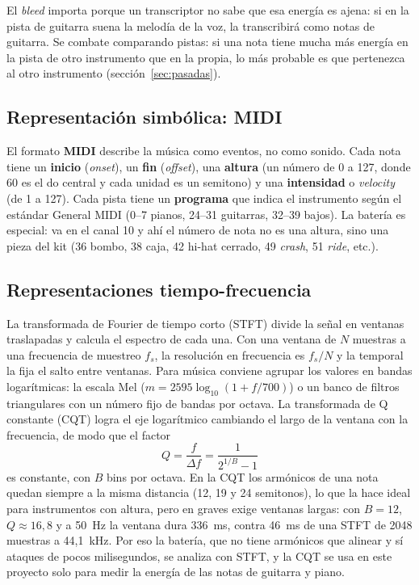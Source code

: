 \documentclass[11pt,a4paper]{article}
\begin{document}
El \emph{bleed} importa porque un transcriptor no sabe que esa energía es ajena: si en la pista de
guitarra suena la melodía de la voz, la transcribirá como notas de guitarra. Se combate comparando
pistas: si una nota tiene mucha más energía en la pista de otro instrumento que en la propia, lo más
probable es que pertenezca al otro instrumento (sección~\ref{sec:pasadas}).

\subsection{Representación simbólica: MIDI}
El formato \textbf{MIDI} describe la música como eventos, no como sonido. Cada nota tiene un
\textbf{inicio} (\emph{onset}), un \textbf{fin} (\emph{offset}), una \textbf{altura} (un número de 0 a 127,
donde 60 es el do central y cada unidad es un semitono) y una \textbf{intensidad} o \emph{velocity}
(de 1 a 127). Cada pista tiene un \textbf{programa} que indica el instrumento según el estándar General
MIDI (0--7 pianos, 24--31 guitarras, 32--39 bajos). La batería es especial: va en el canal 10 y ahí el
número de nota no es una altura, sino una pieza del kit (36 bombo, 38 caja, 42 hi-hat cerrado, 49
\emph{crash}, 51 \emph{ride}, etc.).

\subsection{Representaciones tiempo-frecuencia}
La transformada de Fourier de tiempo corto (STFT) divide la señal en ventanas traslapadas y calcula el
espectro de cada una. Con una ventana de $N$ muestras a una frecuencia de muestreo $f_s$, la resolución
en frecuencia es $f_s/N$ y la temporal la fija el salto entre ventanas. Para música conviene agrupar
los valores en bandas logarítmicas: la escala Mel ($m = 2595\log_{10}(1+f/700)$) o un banco de filtros
triangulares con un número fijo de bandas por octava. La transformada de Q constante (CQT) logra el
eje logarítmico cambiando el largo de la ventana con la frecuencia, de modo que el factor
\begin{equation}
Q = \frac{f}{\Delta f} = \frac{1}{2^{1/B}-1}
\end{equation}
es constante, con $B$ bins por octava. En la CQT los armónicos de una nota quedan siempre a la misma
distancia (12, 19 y 24 semitonos), lo que la hace ideal para instrumentos con altura, pero en graves
exige ventanas largas: con $B=12$, $Q\approx 16{,}8$ y a 50~Hz la ventana dura 336~ms, contra 46~ms de
una STFT de 2048 muestras a 44{,}1~kHz. Por eso la batería, que no tiene armónicos que alinear y sí
ataques de pocos milisegundos, se analiza con STFT, y la CQT se usa en este proyecto solo para medir la
energía de las notas de guitarra y piano.
\end{document}
